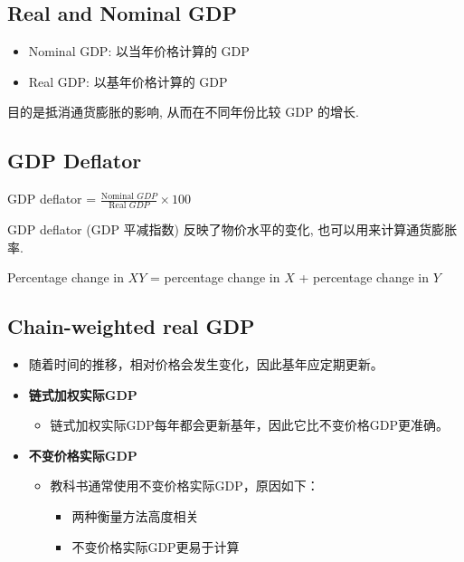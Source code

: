 \subsection{Real and Nominal GDP}
\begin{itemize}
    \item Nominal GDP: 以当年价格计算的 GDP
    \item Real GDP: 以基年价格计算的 GDP
\end{itemize}
\begin{note}
    目的是抵消通货膨胀的影响, 从而在不同年份比较 GDP 的增长.
\end{note}
\subsection{GDP Deflator}
\begin{definition}
    GDP deflator = $\frac{\text{Nominal } GDP}{\text{Real } GDP} \times 100$
\end{definition}
\begin{note}
    GDP deflator (GDP 平减指数) 反映了物价水平的变化, 也可以用来计算通货膨胀率.
\end{note}

\begin{lemma}
    Percentage change in $XY$ = percentage change in $X$ + percentage change in $Y$
\end{lemma}
\subsection{Chain-weighted real GDP}

\begin{itemize}
    \item 随着时间的推移，相对价格会发生变化，因此基年应定期更新。
    \item \textbf{链式加权实际GDP}
    \begin{itemize}
        \item 链式加权实际GDP每年都会更新基年，因此它比不变价格GDP更准确。
    \end{itemize}

    \item \textbf{不变价格实际GDP}
    
\begin{itemize}
        \item 教科书通常使用不变价格实际GDP，原因如下：
        \begin{itemize}
            \item 两种衡量方法高度相关
            \item 不变价格实际GDP更易于计算
        \end{itemize}
    \end{itemize}
\end{itemize}

